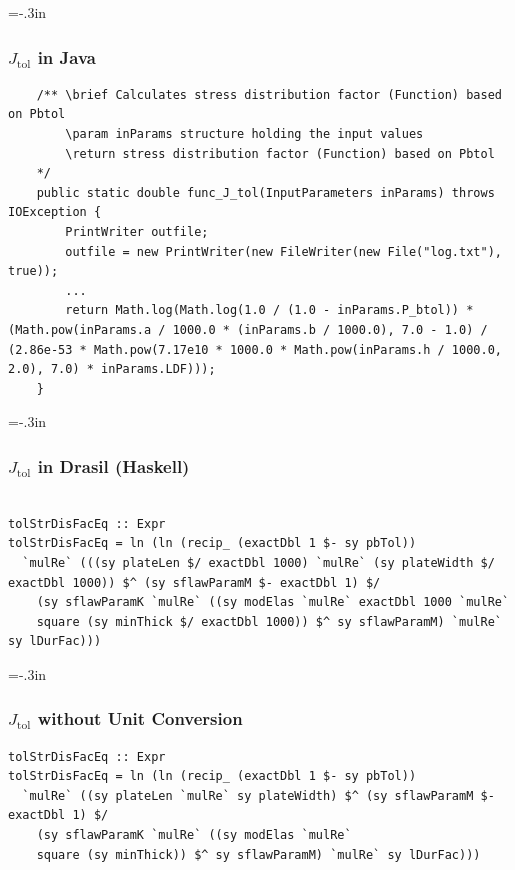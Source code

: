 \documentclass[usenames]{beamer}
\begin{document}
\hoffset=0in
\hoffset=-.3in
\begin{frame}

\frametitle{$J_{\mbox{tol}}$ in Java}

\begin{lstlisting}
    /** \brief Calculates stress distribution factor (Function) based on Pbtol
        \param inParams structure holding the input values
        \return stress distribution factor (Function) based on Pbtol
    */
    public static double func_J_tol(InputParameters inParams) throws IOException {
        PrintWriter outfile;
        outfile = new PrintWriter(new FileWriter(new File("log.txt"), true));
        ...
        return Math.log(Math.log(1.0 / (1.0 - inParams.P_btol)) * (Math.pow(inParams.a / 1000.0 * (inParams.b / 1000.0), 7.0 - 1.0) / (2.86e-53 * Math.pow(7.17e10 * 1000.0 * Math.pow(inParams.h / 1000.0, 2.0), 7.0) * inParams.LDF)));
    }
\end{lstlisting}
\end{frame}
\hoffset=0in
\hoffset=-.3in
\begin{frame}

\frametitle{$J_{\mbox{tol}}$ in Drasil (Haskell)}

\begin{lstlisting}

tolStrDisFacEq :: Expr
tolStrDisFacEq = ln (ln (recip_ (exactDbl 1 $- sy pbTol))
  `mulRe` (((sy plateLen $/ exactDbl 1000) `mulRe` (sy plateWidth $/ exactDbl 1000)) $^ (sy sflawParamM $- exactDbl 1) $/
    (sy sflawParamK `mulRe` ((sy modElas `mulRe` exactDbl 1000 `mulRe`
    square (sy minThick $/ exactDbl 1000)) $^ sy sflawParamM) `mulRe` sy lDurFac)))

\end{lstlisting}
\end{frame}
\hoffset=0in
\hoffset=-.3in
\begin{frame}

\frametitle{$J_{\mbox{tol}}$ without Unit Conversion}

\begin{lstlisting}
tolStrDisFacEq :: Expr
tolStrDisFacEq = ln (ln (recip_ (exactDbl 1 $- sy pbTol))
  `mulRe` ((sy plateLen `mulRe` sy plateWidth) $^ (sy sflawParamM $- exactDbl 1) $/
    (sy sflawParamK `mulRe` ((sy modElas `mulRe`
    square (sy minThick)) $^ sy sflawParamM) `mulRe` sy lDurFac)))
\end{lstlisting}
\end{frame}
\hoffset=0in
\end{document}
